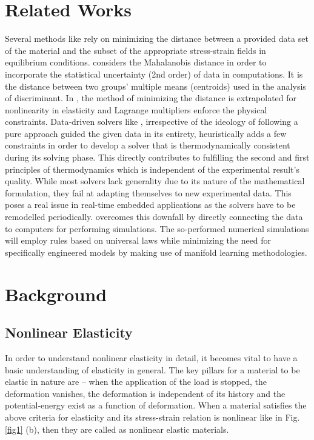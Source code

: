 \documentclass[conference]{IEEEtran}
\begin{document}
\section{Related Works}
\label{related}
Several methods like \cite{8,9} rely on minimizing the distance between a provided data set of the material and the subset of the appropriate stress-strain fields in equilibrium conditions. \cite{8} considers the Mahalanobis distance \cite{28} in order to incorporate the statistical uncertainty (2nd order) of data in computations. It is the distance between two groups' multiple means (centroids) used in the analysis of discriminant. In \cite{18}, the method of minimizing the distance is extrapolated for nonlinearity in elasticity and Lagrange multipliers enforce the physical constraints.
Data-driven solvers like \cite{10}, irrespective of the ideology of following a pure approach guided the given data in its entirety, heuristically adds a few constraints in order to develop a solver that is thermodynamically consistent during its solving phase. This directly contributes to fulfilling the second and first principles of thermodynamics which is independent of the experimental result’s quality. 
While most solvers lack generality due to its nature of the mathematical formulation, they fail at adapting themselves to new experimental data. This poses a real issue in real-time embedded applications as the solvers have to be remodelled periodically. \cite{11} overcomes this downfall by directly connecting the data to computers for performing simulations. The so-performed numerical simulations will employ rules based on universal laws while minimizing the need for specifically engineered models by making use of manifold learning \cite{29} methodologies. 

\section{Background}
\label{background}
\subsection{Nonlinear Elasticity}
In order to understand nonlinear elasticity in detail, it becomes vital to have a basic understanding of elasticity in general. The key pillars for a material to be elastic in nature are – when the application of the load is stopped, the deformation vanishes, the deformation is independent of its history and the potential-energy exist as a function of deformation. When a material satisfies the above criteria for elasticity and its stress-strain relation is nonlinear like in Fig. \ref{fig1} (b), then they are called as nonlinear elastic materials.
\end{document}
